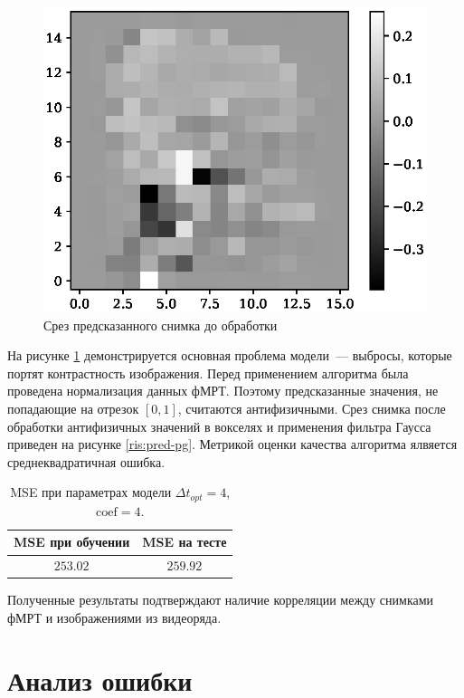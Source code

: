 \documentclass[12pt,twoside]{article}
\begin{document}
\begin{figure}[h!]
    \centering
    \includegraphics[scale = 0.6]{sub-04-4-4-5-_-_-pred.eps}
    \caption{Срез предсказанного снимка до обработки}
    \label{pred}
\end{figure}

На рисунке \ref{pred} демонстрируется основная проблема модели~--- выбросы, которые портят контрастность изображения.
Перед применением алгоритма была проведена нормализация данных фМРТ.
Поэтому предсказанные значения, не попадающие на отрезок $[0,1]$, считаются антифизичными.
Срез снимка после обработки антифизичных значений в вокселях и применения фильтра Гаусса приведен на рисунке \ref{ris:pred-pg}.
Метрикой оценки качества алгоритма ялвяется среднеквадратичная ошибка.
\begin{table}[H]
    \caption{\label{tab:1} MSE при параметрах модели ${\Delta t}_{opt} = 4$, $\mathrm{coef} = 4$.}
    \begin{center}
    \begin{tabular}{|c|c|}
    \hline
    MSE при обучении & MSE на тесте \\
    \hline
    $253.02$ & $259.92$ \\
    \hline
    \end{tabular}
    \end{center}
\end{table} 
Полученные результаты подтверждают наличие корреляции между снимками фМРТ и изображениями из видеоряда.



\section{Анализ ошибки}
\end{document}
